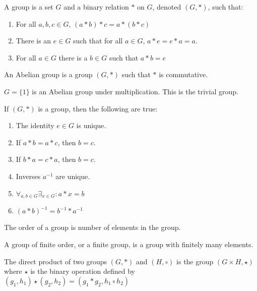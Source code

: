         \begin{definition}
            A group is a set $G$ and a binary relation $*$
            on $G$, denoted $(G,*)$, such that:
            \begin{enumerate}
                \item For all ${a,b,c}\in{G}$, $(a*b)*c=a*(b*c)$
                \item There is an ${e}\in{G}$ such that for all
                    ${a}\in{G}$, $a*e=e*a=a$.
                \item For all ${a}\in{G}$ there is a ${b}\in{G}$
                    such that $a*b=e$
            \end{enumerate}
        \end{definition}
        \begin{definition}
            An Abelian group is a group $(G,*)$ such that
            $*$ is commutative.
        \end{definition}
        \begin{example}
            $G=\{1\}$ is an Abelian group under multiplication.
            This is the trivial group.
        \end{example}
        \begin{theorem}
            If $(G,*)$ is a group, then the following are true:
            \begin{enumerate}
                \item The identity ${e}\in{G}$ is unique.
                \item If $a*b=a*c$, then $b=c$.
                \item If $b*a=c*a$, then $b=c$.
                \item Inverses $a^{-1}$ are unique.
                \item $\forall_{{a,b}\in{G}}\exists_{{x}\in{G}}:a*x=b$
                \item $(a*b)^{-1}=b^{-1}*a^{-1}$
            \end{enumerate}
        \end{theorem}
        \begin{definition}
            The order of a group is number of elements in the
            group.
        \end{definition}
        \begin{definition}
            A group of finite order, or a finite group,
            is a group with finitely many elements.
        \end{definition}
        \begin{definition}
            The direct product of two groups $(G,*)$ and
            $(H,\circ)$ is the group  $({G}\times{H},\star)$
            where $\star$ is the binary operation defined by
            $(g_{1},h_{1})\star(g_{2},h_{2})%
             =(g_{1}*g_{2},{h_{1}}\circ{h_{2}})$
        \end{definition}
